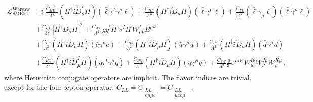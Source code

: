 \documentclass[../report.tex]{subfiles}
\begin{document}
{\small
\begin{align}
\label{eq8:L11}
\mathcal{L}_\text{SMEFT}^\text{Warsaw} &\supset \frac{C_{HL}^{(3)}}{\Lambda^2} (H^\dag i\overleftrightarrow{D}^I_\mu H)(\bar\ell \tau^I \gamma^\mu \ell) + \frac{C_{HL}}{\Lambda^2}(H^\dag i\overleftrightarrow{D}_\mu H)(\bar \ell \gamma^\mu \ell) +\frac{C_{LL}}{\Lambda^2}(\bar \ell \gamma_\mu \ell)(\bar \ell \gamma^\mu \ell) \nonumber \\
&+ \frac{C_{HD}}{\Lambda^2}\left|H^\dag D_\mu H\right|^2 + \frac{C_{WB}}{\Lambda^2} g g^\prime H^\dag \tau^I H\, W^I_{\mu\nu} B^{\mu\nu}  \nonumber  \\ 
&+ \frac{C_{He}}{\Lambda^2} (H^\dag i\overleftrightarrow{D}_\mu H)(\bar e \gamma^\mu e) \nonumber + \frac{C_{Hu}}{\Lambda^2} (H^\dag i\overleftrightarrow{D}_\mu H)(\bar u \gamma^\mu u) + \frac{C_{Hd}}{\Lambda^2} (H^\dag i\overleftrightarrow{D}_\mu H)(\bar d \gamma^\mu d) \nonumber \\
&+ \frac{C_{HQ}^{(3)}}{\Lambda^2} (H^\dag i\overleftrightarrow{D}^I_\mu H)(\bar q \tau^I \gamma^\mu q) + \frac{C_{HQ}}{\Lambda^2} (H^\dag i\overleftrightarrow{D}_\mu H)(\bar q \gamma^\mu q) + \frac{C_{3W}}{\Lambda^2} \frac{g}{3!} \epsilon^{IJK} W_\mu^{I\nu} W_\nu^{J\rho} W_\rho^{K\mu} \, ,
\end{align}
}
%
where Hermitian conjugate operators are implicit.
The flavor indices are trivial, except for the four-lepton operator, $C_{LL} = C_{\substack{LL \\ e\mu\mu e}} = C_{\substack{LL \\ \mu ee\mu}}$~\cite{Cirigliano:2009wk}, 
\end{document}
